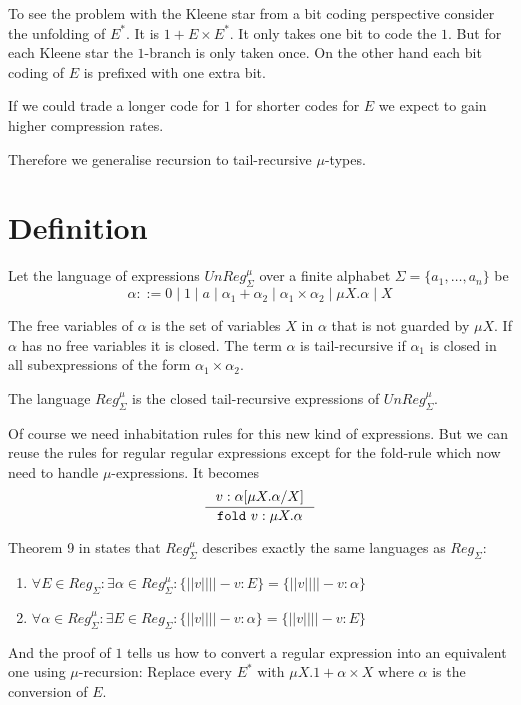 \documentclass[a4paper, oneside]{memoir}
\theoremstyle{definition}
\begin{document}
To see the problem with the Kleene star from a bit coding perspective consider
the unfolding of $E^{\ast}$. It is $1 + E \times E^{\ast}$. It only takes one
bit to code the $1$. But for each Kleene star the $1$-branch is only taken
once. On the other hand each bit coding of $E$ is prefixed with one extra
bit.

If we could trade a longer code for $1$ for shorter codes for $E$ we expect to
gain higher compression rates.

Therefore we generalise recursion to tail-recursive $\mu$-types.

\section{Definition}
Let the language of expressions $UnReg_{\Sigma}^{\mu}$ over a finite alphabet
$\Sigma = \{a_1, \ldots, a_n\}$ be
\[
\alpha ::= 0 \; | \; 1 \; | \; a \; | \; \alpha_1 + \alpha_2 \; | \; \alpha_1
\times \alpha_2 \; | \; \mu X. \alpha \; | \; X
\]

The free variables of $\alpha$ is the set of variables $X$ in $\alpha$ that is
not guarded by $\mu X$. If $\alpha$ has no free variables it is closed. The term
$\alpha$ is tail-recursive if $\alpha_1$ is closed in all subexpressions of the
form $\alpha_1 \times \alpha_2$.

The language $Reg_{\Sigma}^{\mu}$ is the closed tail-recursive expressions of
$UnReg_{\Sigma}^{\mu}$.

Of course we need inhabitation rules for this new kind of expressions. But we
can reuse the rules for regular regular expressions except for the fold-rule
which now need to handle $\mu$-expressions. It becomes
\[
\inference{v : \alpha \lbrack \mu X. \alpha / X \rbrack}{\mathtt{fold}\ v : \mu X. \alpha}
\]

Theorem 9 in \cite{heni2010} states that $Reg_{\Sigma}^{\mu}$ describes exactly
the same languages as $Reg_{\Sigma}$:

\begin{enumerate}
\item $\forall E \in Reg_{\Sigma} : \exists \alpha \in Reg_{\Sigma}^{\mu} :
  \{||v|| | |- v : E\} = \{||v|| | |- v : \alpha \}$
\item $\forall \alpha \in Reg_{\Sigma}^{\mu} : \exists E \in Reg_{\Sigma} :
  \{||v|| | |- v : \alpha\} = \{||v|| | |- v : E \}$
\end{enumerate}

And the proof of $1$ tells us how to convert a regular expression into an
equivalent one using $\mu$-recursion: Replace every $E^{\ast}$ with $\mu X.1 +
\alpha \times X$ where $\alpha$ is the conversion of $E$.
\end{document}

